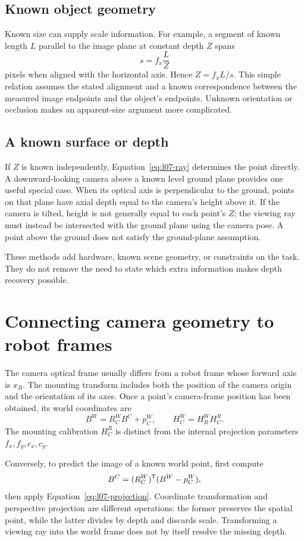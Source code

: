 \subsection{Known object geometry}
Known size can supply scale information. For example, a segment of known
length $L$ parallel to the image plane at constant depth $Z$ spans
\[
 s=f_x\frac LZ
\]
pixels when aligned with the horizontal axis. Hence $Z=f_xL/s$.
This simple relation assumes the stated alignment and a known correspondence
between the measured image endpoints and the object's endpoints. Unknown
orientation or occlusion makes an apparent-size argument more complicated.

\subsection{A known surface or depth}
If $Z$ is known independently, Equation~\eqref{eq:l07-ray} determines the
point directly. A downward-looking camera above a known level ground plane
provides one useful special case. When its optical axis is perpendicular
to the ground, points on that plane have axial depth equal to the camera's
height above it. If the camera is tilted, height is not generally equal to
each point's $Z$; the viewing ray must instead be intersected with the
ground plane using the camera pose. A point above the ground does not satisfy
the ground-plane assumption.

These methods add hardware, known scene geometry, or constraints on the
task. They do not remove the need to state which extra information makes
depth recovery possible.

\section{Connecting camera geometry to robot frames}
The camera optical frame usually differs from a robot frame whose forward
axis is $x_R$. The mounting transform includes both the position of the
camera origin and the orientation of its axes. Once a point's camera-frame
position has been obtained, its world coordinates are
\begin{equation}
 B^W=R_C^W B^C+p_C^W,\qquad
 H_C^W=H_R^W H_C^R.
 \label{eq:l07-world}
\end{equation}
The mounting calibration $H_C^R$ is distinct from the internal projection
parameters $f_x,f_y,c_x,c_y$.

Conversely, to predict the image of a known world point, first compute
\[
 B^C=(R_C^W)^{\mathsf T}(B^W-p_C^W),
\]
then apply Equation~\eqref{eq:l07-projection}. Coordinate transformation
and perspective projection are different operations: the former preserves
the spatial point, while the latter divides by depth and discards scale.
Transforming a viewing ray into the world frame does not by itself resolve
the missing depth.

